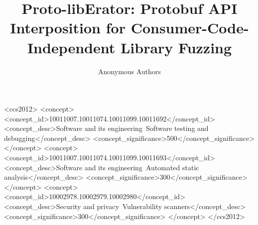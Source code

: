 \documentclass[sigconf,anonymous]{acmart}
\begin{document}
\title{Proto-libErator: Protobuf API Interposition for Consumer-Code-Independent Library Fuzzing}

\author{Anonymous Authors}

\begin{CCSXML}
<ccs2012>
  <concept>
    <concept_id>10011007.10011074.10011099.10011692</concept_id>
    <concept_desc>Software and its engineering~Software testing and debugging</concept_desc>
    <concept_significance>500</concept_significance>
  </concept>
  <concept>
    <concept_id>10011007.10011074.10011099.10011693</concept_id>
    <concept_desc>Software and its engineering~Automated static analysis</concept_desc>
    <concept_significance>300</concept_significance>
  </concept>
  <concept>
    <concept_id>10002978.10002979.10002980</concept_id>
    <concept_desc>Security and privacy~Vulnerability scanners</concept_desc>
    <concept_significance>300</concept_significance>
  </concept>
</ccs2012>
\end{CCSXML}
\end{document}
